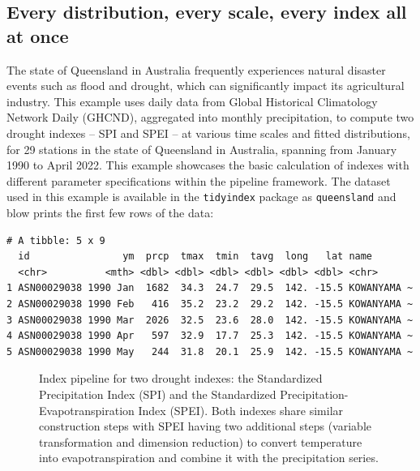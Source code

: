 \documentclass[
]{interact}
\begin{document}
\subsection{Every distribution, every scale, every index all at
once}\label{sec-example1}

The state of Queensland in Australia frequently experiences natural
disaster events such as flood and drought, which can significantly
impact its agricultural industry. This example uses daily data from
Global Historical Climatology Network Daily (GHCND), aggregated into
monthly precipitation, to compute two drought indexes -- SPI and SPEI --
at various time scales and fitted distributions, for 29 stations in the
state of Queensland in Australia, spanning from January 1990 to April
2022. This example showcases the basic calculation of indexes with
different parameter specifications within the pipeline framework. The
dataset used in this example is available in the \texttt{tidyindex}
package as \texttt{queensland} and blow prints the first few rows of the
data:

\begin{verbatim}
# A tibble: 5 x 9
  id                ym  prcp  tmax  tmin  tavg  long   lat name       
  <chr>          <mth> <dbl> <dbl> <dbl> <dbl> <dbl> <dbl> <chr>      
1 ASN00029038 1990 Jan  1682  34.3  24.7  29.5  142. -15.5 KOWANYAMA ~
2 ASN00029038 1990 Feb   416  35.2  23.2  29.2  142. -15.5 KOWANYAMA ~
3 ASN00029038 1990 Mar  2026  32.5  23.6  28.0  142. -15.5 KOWANYAMA ~
4 ASN00029038 1990 Apr   597  32.9  17.7  25.3  142. -15.5 KOWANYAMA ~
5 ASN00029038 1990 May   244  31.8  20.1  25.9  142. -15.5 KOWANYAMA ~
\end{verbatim}

\begin{figure}


\caption{\label{fig-spei}Index pipeline for two drought indexes: the
Standardized Precipitation Index (SPI) and the Standardized
Precipitation-Evapotranspiration Index (SPEI). Both indexes share
similar construction steps with SPEI having two additional steps
(variable transformation and dimension reduction) to convert temperature
into evapotranspiration and combine it with the precipitation series.}

\end{figure}%
\end{document}

